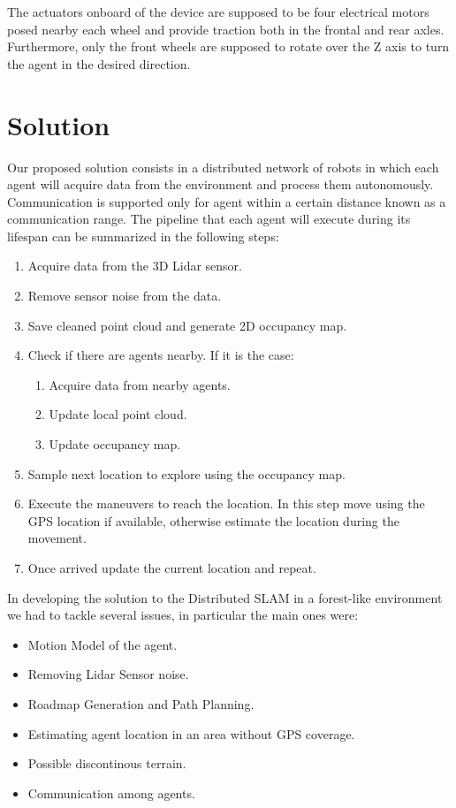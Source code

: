 \documentclass[twocolumn, a4paper]{article}
\begin{document}
The actuators onboard of the device are supposed to be four electrical motors
posed nearby each wheel and provide traction both in the frontal and rear
axles. Furthermore, only the front wheels are supposed to rotate over
the Z axis to turn the agent in the desired direction.

\section{Solution}
\label{sec:Solution}
Our proposed solution consists in a distributed network of robots in which
each agent will acquire data from the environment and process them
autonomously. Communication is supported only for agent within a certain
distance known as a communication range.
The pipeline that each agent will execute during its lifespan can be summarized
in the following steps:
\begin{enumerate}
    \item Acquire data from the 3D Lidar sensor.
    \item Remove sensor noise from the data.
    \item Save cleaned point cloud and generate 2D occupancy map.
    \item Check if there are agents nearby. If it is the case:
        \begin{enumerate}
                \item Acquire data from nearby agents.
                \item Update local point cloud.
                \item Update occupancy map.
        \end{enumerate}
    \item Sample next location to explore using the occupancy map.
    \item Execute the maneuvers to reach the location. In this step move
          using the GPS location if available, otherwise estimate the
          location during the movement.
    \item Once arrived update the current location and repeat.
\end{enumerate}

In developing the solution to the Distributed SLAM in a forest-like
environment we had to tackle several issues, in particular the main ones
were:
\begin{itemize}
        \item Motion Model of the agent. %
        \item Removing Lidar Sensor noise. %
        \item Roadmap Generation and Path Planning.
        \item Estimating agent location in an area without GPS coverage.%
        \item Possible discontinous terrain. %
        \item Communication among agents.
\end{itemize}
\end{document}
